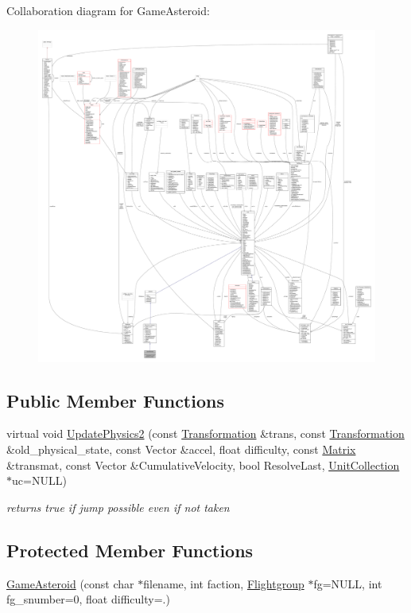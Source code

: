 Collaboration diagram for Game\+Asteroid\+:
\nopagebreak
\begin{figure}[H]
\begin{center}
\leavevmode
\includegraphics[width=350pt]{da/db1/classGameAsteroid__coll__graph}
\end{center}
\end{figure}
\subsection*{Public Member Functions}
\begin{DoxyCompactItemize}
\item 
virtual void \hyperlink{classGameAsteroid_a7bc503988abf7084187034a723a08aed}{Update\+Physics2} (const \hyperlink{structTransformation}{Transformation} \&trans, const \hyperlink{structTransformation}{Transformation} \&old\+\_\+physical\+\_\+state, const Vector \&accel, float difficulty, const \hyperlink{classMatrix}{Matrix} \&transmat, const Vector \&Cumulative\+Velocity, bool Resolve\+Last, \hyperlink{classUnitCollection}{Unit\+Collection} $\ast$uc=N\+U\+LL)
\begin{DoxyCompactList}\small\item\em returns true if jump possible even if not taken \end{DoxyCompactList}\end{DoxyCompactItemize}
\subsection*{Protected Member Functions}
\begin{DoxyCompactItemize}
\item 
\hyperlink{classGameAsteroid_aa1dfce4ffca3206f2ead9e84d494358e}{Game\+Asteroid} (const char $\ast$filename, int faction, \hyperlink{classFlightgroup}{Flightgroup} $\ast$fg=N\+U\+LL, int fg\+\_\+snumber=0, float difficulty=.)
\end{DoxyCompactItemize}
